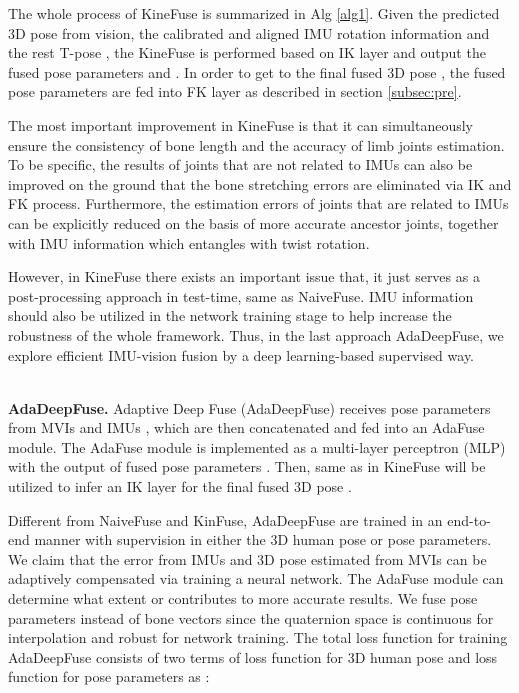 \documentclass[lettersize,journal]{IEEEtran}
\begin{document}
The whole process of KineFuse is summarized in Alg \ref{alg1}. Given the predicted 3D pose  from vision, the calibrated and aligned IMU rotation information  and the rest T-pose , the KineFuse is performed based on IK layer and output the fused pose parameters  and . In order to get to the final fused 3D pose , the fused pose parameters are fed into FK layer as described in section \ref{subsec:pre}.

The most important improvement in KineFuse is that it can simultaneously ensure the consistency of bone length and the accuracy of limb joints estimation. To be specific, the results of joints that are not related to IMUs can also be improved on the ground that the bone stretching errors are eliminated via IK and FK process. Furthermore, the estimation errors of joints that are related to IMUs can be explicitly reduced on the basis of more accurate ancestor joints, together with IMU information which entangles with twist rotation.

However, in KineFuse there exists an important issue that, it just serves as a post-processing approach in test-time, same as NaiveFuse. IMU information should also be utilized in the network training stage to help increase the robustness of the whole framework. Thus, in the last approach AdaDeepFuse, we explore efficient IMU-vision fusion by a deep learning-based supervised way.

~\\
\noindent \textbf{AdaDeepFuse.} Adaptive Deep Fuse (AdaDeepFuse) receives pose parameters from MVIs  and IMUs , which are then concatenated and fed into an AdaFuse module. The AdaFuse module is implemented as a multi-layer perceptron (MLP) with the output of fused pose parameters . Then, same as in KineFuse  will be utilized to infer an IK layer for the final fused 3D pose .

Different from NaiveFuse and KinFuse, AdaDeepFuse are trained in an end-to-end manner with supervision in either the 3D human pose or pose parameters. We claim that the error from IMUs and 3D pose estimated from MVIs can be adaptively compensated via training a neural network. The AdaFuse module can determine what extent  or  contributes to more accurate results. We fuse pose parameters instead of bone vectors since the quaternion space is continuous for interpolation and robust for network training. The total loss  function for training AdaDeepFuse consists of two terms of loss function for 3D human pose  and loss function for pose parameters  as :
\end{document}
